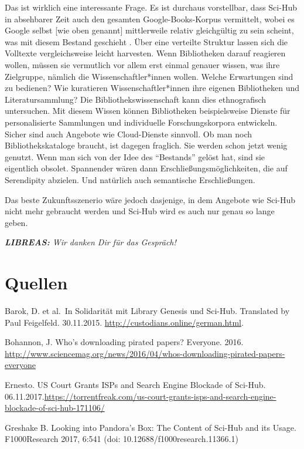 \documentclass[a4paper,
fontsize=11pt,
oneside,
numbers=noperiodatend,
parskip=half-,
bibliography=totoc,
final
]{scrartcl}
\begin{document}
Das ist wirklich eine interessante Frage. Es ist durchaus vorstellbar,
dass Sci-Hub in absehbarer Zeit auch den gesamten Google-Books-Korpus
vermittelt, wobei es Google selbst {[}wie oben genannt{]} mittlerweile
relativ gleichgültig zu sein scheint, was mit diesem Bestand geschieht .
Über eine verteilte Struktur lassen sich die Volltexte vergleichsweise
leicht harvesten. Wenn Bibliotheken darauf reagieren wollen, müssen sie
vermutlich vor allem erst einmal genauer wissen, was ihre Zielgruppe,
nämlich die Wissenschaftler*innen wollen. Welche Erwartungen sind zu
bedienen? Wie kuratieren Wissenschaftler*innen ihre eigenen Bibliotheken
und Literatursammlung? Die Bibliothekswissenschaft kann dies
ethnografisch untersuchen. Mit diesem Wissen können Bibliotheken
beispielsweise Dienste für personalisierte Sammlungen und individuelle
Forschungskorpora entwickeln. Sicher sind auch Angebote wie
Cloud-Dienste sinnvoll. Ob man noch Bibliothekskataloge braucht, ist
dagegen fraglich. Sie werden schon jetzt wenig genutzt. Wenn man sich
von der Idee des \enquote{Bestands} gelöst hat, sind sie eigentlich
obsolet. Spannender wären dann Erschließungsmöglichkeiten, die auf
Serendipity abzielen. Und natürlich auch semantische Erschließungen.

Das beste Zukunftsszenerio wäre jedoch dasjenige, in dem Angebote wie
Sci-Hub nicht mehr gebraucht werden und Sci-Hub wird es auch nur genau
so lange geben.

\emph{\textbf{LIBREAS:} Wir danken Dir für das Gespräch!}

\hypertarget{quellen}{%
\section*{Quellen}\label{quellen}}

Barok, D. et al.~In Solidarität mit Library Genesis und Sci-Hub.
Translated by Paul Feigelfeld. 30.11.2015.
\url{http://custodians.online/german.html}.

Bohannon, J. Who's downloading pirated papers? Everyone. 2016.
\url{http://www.sciencemag.org/news/2016/04/whos-downloading-pirated-papers-everyone}

Ernesto. US Court Grants ISPs and Search Engine Blockade of Sci-Hub.
06.11.2017.\url{https://torrentfreak.com/us-court-grants-isps-and-search-engine-blockade-of-sci-hub-171106/}

Greshake B. Looking into Pandora's Box: The Content of Sci-Hub and its
Usage. F1000Research 2017, 6:541 (doi: 10.12688/f1000research.11366.1)
\end{document}
